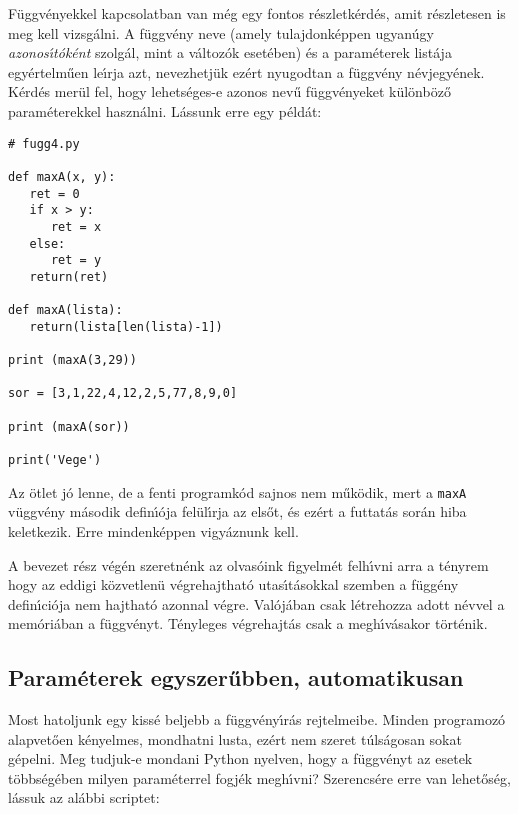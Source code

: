 \documentclass[12pt]{article}
\begin{document}
F\"uggv\'enyekkel kapcsolatban van m\'eg egy fontos r\'eszletk\'erd\'es, amit r\'eszletesen is meg kell vizsg\'alni. 
A f\"uggv\'eny neve (amely tulajdonk\'eppen ugyan\'ugy {\sl azonos\'{\i}t\'ok\'ent} szolg\'al, mint a v\'altoz\'ok 
eset\'eben) \'es a param\'eterek list\'aja egy\'ertelm\H{u}en le\'{\i}rja azt, nevezhetj\"uk ez\'ert nyugodtan a 
f\"uggv\'eny  n\'evjegy\'enek. K\'erd\'es mer\"ul fel, hogy lehets\'eges-e azonos nev\H{u} f\"uggv\'enyeket 
k\"ul\"onb\"oz\H{o} param\'eterekkel haszn\'alni. L\'assunk erre egy p\'eld\'at:

\begin{Verbatim}[fontsize=\small]
# fugg4.py

def maxA(x, y):
   ret = 0
   if x > y:
      ret = x
   else:
      ret = y
   return(ret)

def maxA(lista):
   return(lista[len(lista)-1])

print (maxA(3,29))

sor = [3,1,22,4,12,2,5,77,8,9,0]

print (maxA(sor))

print('Vege')  
\end{Verbatim}

Az \"otlet j\'o lenne, de a fenti programk\'od sajnos nem m\H{u}k\"odik, mert a {\tt maxA} v\"uggv\'eny 
m\'asodik defin\'{\i}\'oja fel\"ul\'{\i}rja az els\H{o}t, \'es ez\'ert a futtat\'as sor\'an hiba keletkezik. 
Erre mindenk\'eppen vigy\'aznunk kell.

A bevezet r\'esz v\'eg\'en szeretn\'enk az olvas\'oink figyelm\'et felh\'{\i}vni arra a t\'enyrem hogy az 
eddigi k\"ozvetlen\"u v\'egrehajthat\'o utas\'{\i}t\'asokkal szemben a f\"ugg\'eny defin\'{\i}ci\'oja nem 
hajthat\'o azonnal v\'egre. Val\'oj\'aban csak l\'etrehozza adott n\'evvel a mem\'ori\'aban a f\"uggv\'enyt. 
T\'enyleges v\'egrehajt\'as csak a megh\'{\i}v\'asakor t\"ort\'enik.

\subsection{Param\'eterek egyszer\H{u}bben, automatikusan}

Most hatoljunk egy kiss\'e beljebb a f\"uggv\'eny\'{\i}r\'as rejtelmeibe. Minden programoz\'o alapvet\H{o}en k\'enyelmes, 
mondhatni lusta, ez\'ert nem szeret t\'uls\'agosan sokat g\'epelni. Meg tudjuk-e mondani Python nyelven, hogy a 
f\"uggv\'enyt az esetek t\"obbs\'eg\'eben milyen param\'eterrel fogj\'ek megh\'{\i}vni? Szerencs\'ere erre van lehet\H{o}s\'eg, 
l\'assuk az al\'abbi scriptet:
\end{document}
